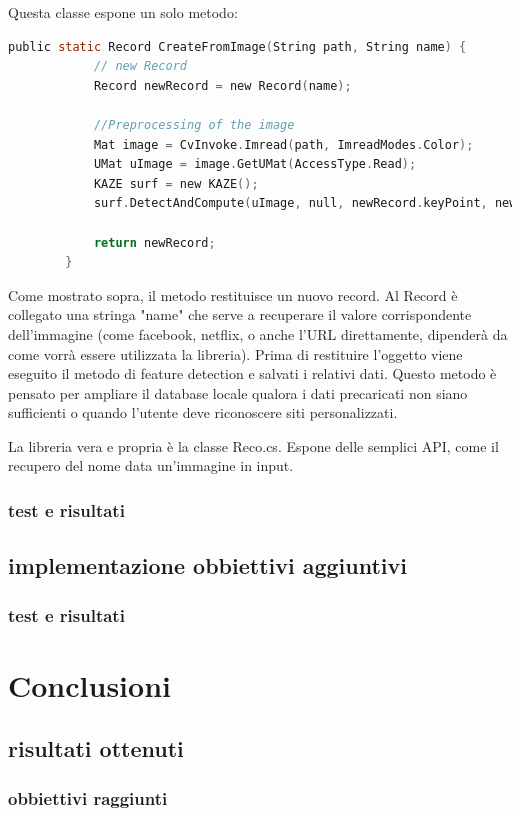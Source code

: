\documentclass[twoside]{supsistudent}
\begin{document}
Questa classe espone un solo metodo:

\begin{lstlisting}[language=C]
public static Record CreateFromImage(String path, String name) {
            // new Record
            Record newRecord = new Record(name);

            //Preprocessing of the image
            Mat image = CvInvoke.Imread(path, ImreadModes.Color);
            UMat uImage = image.GetUMat(AccessType.Read);
            KAZE surf = new KAZE();
            surf.DetectAndCompute(uImage, null, newRecord.keyPoint, newRecord.descriptors, false);

            return newRecord;
        }
\end{lstlisting}

Come mostrato sopra, il metodo restituisce un nuovo record. Al Record è collegato una stringa "name" che serve a recuperare il valore corrispondente dell'immagine (come facebook, netflix, o anche l'URL direttamente, dipenderà da come vorrà essere utilizzata la libreria). Prima di restituire l'oggetto viene eseguito il metodo di feature detection e salvati i relativi dati. Questo metodo è pensato per ampliare il database locale qualora i dati precaricati non siano sufficienti o quando l'utente deve riconoscere siti personalizzati. 

La libreria vera e propria è la classe Reco.cs. Espone delle semplici API, come il recupero del nome data un'immagine in input. 

\subsection{test e risultati}%
\section{implementazione obbiettivi aggiuntivi}%
\subsection{test e risultati}%

\chapter{Conclusioni}
\section{risultati ottenuti}
\subsection{obbiettivi raggiunti}
\end{document}
